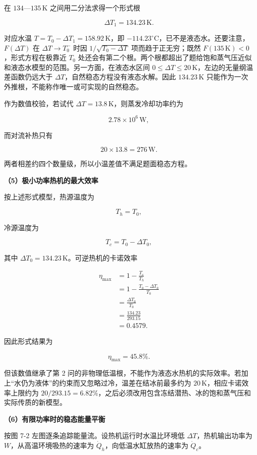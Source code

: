 \documentclass[12pt,a4paper,UTF8]{ctexart}
\begin{document}
在 \(134\)---\(135\,\mathrm K\) 之间用二分法求得一个形式根

\[
\boxed{\Delta T_1=134.23\,\mathrm K}.
\]

对应水温 \(T=T_0-\Delta T_1=158.92\,\mathrm K\)，即
\(-114.23^\circ\mathrm C\)，已不是液态水。还要注意，\(F(\Delta T)\) 在
\(\Delta T\to T_0^-\) 时因 \(1/\sqrt{T_0-\Delta T}\)
项而趋于正无穷；既然 \(F(135\,\mathrm K)<0\)，形式方程在极靠近 \(T_0\)
处还会有第二个根。两个根都超出了题给饱和蒸气压近似和液态水模型的范围。另一方面，在液态水区间
\(0\leq\Delta T\leq20\,\mathrm K\)，左边的无量纲温差函数仍远大于
\(\Delta T\)，自然稳态方程没有液态水解。因此 \(134.23\,\mathrm K\)
只能作为一次外推根，不能称作唯一或可实现的自然稳态。

作为数值校验，若试代 \(\Delta T=13.8\,\mathrm K\)，则蒸发冷却功率约为

\[
2.78\times10^6\,\mathrm W,
\]

而对流补热只有

\[
20\times13.8=276\,\mathrm W.
\]

两者相差约四个数量级，所以小温差值不满足题面稳态方程。

\textbf{（5）极小功率热机的最大效率}

按上述形式模型，热源温度为

\[T_h=T_0,\]

冷源温度为

\[T_c=T_0-\Delta T_0,\]

其中 \(\Delta T_0=134.23\,\mathrm K\)。可逆热机的卡诺效率

\[
\begin{aligned}
\eta_{\max}
&=1-\frac{T_c}{T_h}\\
&=1-\frac{T_0-\Delta T_0}{T_0}\\
&=\frac{\Delta T_0}{T_0}\\
&=\frac{134.23}{293.15}\\
&=0.4579.
\end{aligned}
\]

因此形式结果为

\[
\boxed{\eta_{\max}=45.8\%}.
\]

但该数值继承了第 2
问的非物理低温根，不能作为液态水热机的实际效率。若加上``水仍为液体''的约束而又忽略过冷，温差在结冰前最多约为
\(20\,\mathrm K\)，相应卡诺效率上限约为
\(20/293.15=6.82\%\)，之后必须改用包含冻结潜热、冰的饱和蒸气压和实际传质的新模型。

\textbf{（6）有限功率时的稳态能量平衡}

按图 7-2 左图逐条追踪能量流。设热机运行时水温比环境低
\(\Delta T\)，热机输出功率为 \(W\)，从高温环境吸热的速率为
\(\dot Q_h\)，向低温水缸放热的速率为 \(\dot Q_c\)。
\end{document}
